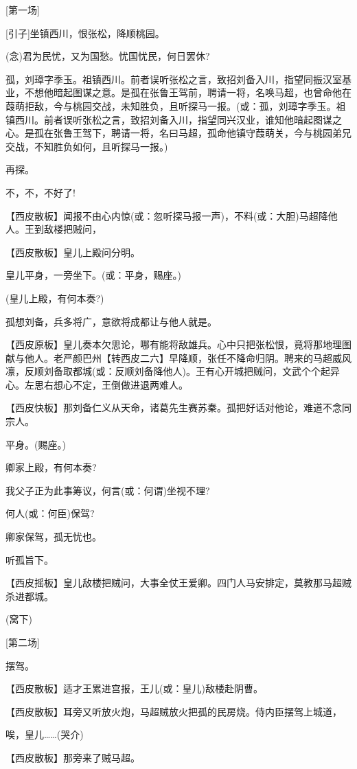 {[}第一场{]}

{[}引子{]}坐镇西川，恨张松，降顺桃园。

(念)君为民忧，又为国愁。忧国忧民，何日罢休?

孤，刘璋字季玉。祖镇西川。前者误听张松之言，致招刘备入川，指望同振汉室基业，不想他暗起图谋之意。是孤在张鲁王驾前，聘请一将，名唤马超，也曾命他在葭萌拒敌，今与桃园交战，未知胜负，且听探马一报。(或：孤，刘璋字季玉。祖镇西川。前者误听张松之言，致招刘备入川，指望同兴汉业，谁知他暗起图谋之心。是孤在张鲁王驾下，聘请一将，名曰马超，孤命他镇守葭萌关，今与桃园弟兄交战，不知胜负如何，且听探马一报。)

再探。

不，不，不好了!

【西皮散板】闻报不由心内惊(或：忽听探马报一声)，不料(或：大胆)马超降他人。王到敌楼把贼问，

【西皮散板】皇儿上殿问分明。

皇儿平身，一旁坐下。(或：平身，赐座。)

(皇儿上殿，有何本奏?)

孤想刘备，兵多将广，意欲将成都让与他人就是。

【西皮原板】皇儿奏本欠思论，哪有能将敌雄兵。心中只把张松恨，竟将那地理图献与他人。老严颜巴州【转西皮二六】早降顺，张任不降命归阴。聘来的马超威风凛，反顺刘备取都城(或：反顺刘备降他人)。王有心开城把贼问，文武个个起异心。左思右想心不定，王倒做进退两难人。

【西皮快板】那刘备仁义从天命，诸葛先生赛苏秦。孤把好话对他论，难道不念同宗人。

平身。(赐座。)

卿家上殿，有何本奏?

我父子正为此事筹议，何言(或：何谓)坐视不理?

何人(或：何臣)保驾?

卿家保驾，孤无忧也。

听孤旨下。

【西皮摇板】皇儿敌楼把贼问，大事全仗王爱卿。四门人马安排定，莫教那马超贼杀进都城。

(窝下)

{[}第二场{]}

摆驾。

【西皮散板】适才王累进宫报，王儿(或：皇儿)敌楼赴阴曹。

【西皮散板】耳旁又听放火炮，马超贼放火把孤的民房烧。侍内臣摆驾上城道，

唉，皇儿\ldots{}\ldots{}(哭介)

【西皮散板】那旁来了贼马超。

